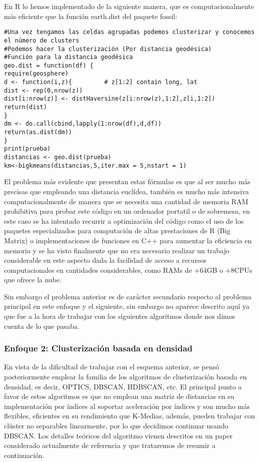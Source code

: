 \documentclass[11pt, a4paper]{article} %
\begin{document}
En R lo hemos implementado de la siguiente manera, que es computacionalmente más eficiente que la función earth.dist del paquete fossil:
\begin{lstlisting}
#Una vez tengamos las celdas agrupadas podemos clusterizar y conocemos el número de clusters
#Podemos hacer la clusterización (Por distancia geodésica)
#Función para la distancia geodésica
geo.dist = function(df) {
require(geosphere)
d <- function(i,z){         # z[1:2] contain long, lat
dist <- rep(0,nrow(z))
dist[i:nrow(z)] <- distHaversine(z[i:nrow(z),1:2],z[i,1:2])
return(dist)
}
dm <- do.call(cbind,lapply(1:nrow(df),d,df))
return(as.dist(dm))
}
print(prueba)
distancias <- geo.dist(prueba) 
km<-bigkmeans(distancias,5,iter.max = 5,nstart = 1)
\end{lstlisting}
El problema más evidente que presentan estas fórmulas es que al ser mucho más precisas que empleando una distancia euclídea, también es mucho más intensiva computacionalmente de manera que se necesita una cantidad de memoria RAM prohibitiva para probar este código en un ordenador portatil o de sobremesa, en este caso se ha intentado recurrir a optimización del código como el uso de los paquetes especializados para computación de altas prestaciones de R (Big Matrix) o implementaciones de funciones en C++ para aumentar la eficiencia en memoria y se ha visto finalmente que no era necesario realizar un trabajo considerable en este aspecto dada la facilidad de acceso a recursos computacionales en cantidades considerables, como RAMs de +64GB o +8CPUs que ofrece la nube.


Sin embargo el problema anterior es de carácter secundario respecto al problema principal en este enfoque y el siguiente, sin embargo no aparece descrito aquí ya que fue a la hora de trabajar con los siguientes algoritmos donde nos dimos cuenta de lo que pasaba.
\subsubsection{Enfoque 2: Clusterización basada en densidad}
En vista de la dificultad de trabajar con el esquema anterior, se pensó posteriormente emplear la familia de los algoritmos de clusterización basada en densidad, es decir, OPTICS, DBSCAN, HDBSCAN, etc. El principal punto a favor de estos algoritmos es que no emplean una matriz de distancias en su implementación por índices al soportar aceleración por índices y son mucho más flexibles, eficientes en su rendimiento que K-Medias, además, pueden trabajar con clúster no separables linearmente, por lo que decidimos continuar usando DBSCAN. Los detalles teóricos del algoritmo vienen descritos en un paper considerado actualmente de referencia y que trataremos de resumir a continuación. 
\end{document}
